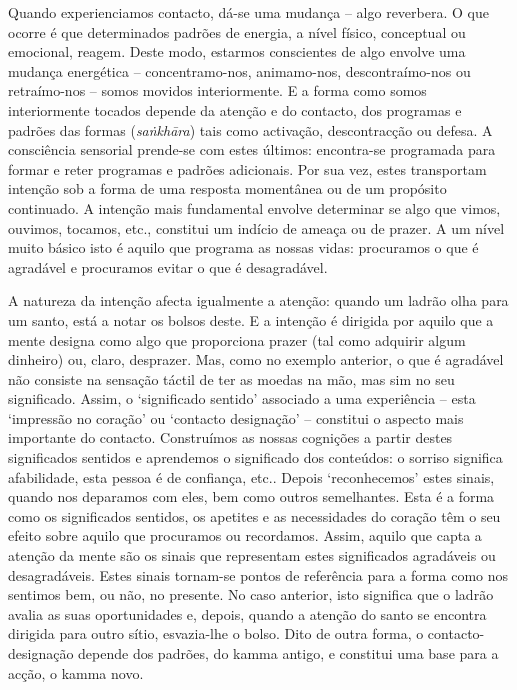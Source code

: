 Quando experienciamos contacto, dá-se uma mudança -- algo reverbera. O que ocorre é que determinados padrões de energia, a nível físico, conceptual ou emocional, reagem. Deste modo, estarmos conscientes de algo envolve uma mudança energética -- concentramo-nos, animamo-nos, descontraímo-nos ou retraímo-nos -- somos movidos interiormente. E a forma como somos interiormente tocados depende da atenção e do contacto, dos programas e padrões das formas (\emph{saṅkhāra}) tais como activação, descontracção ou defesa. A consciência sensorial prende-se com estes últimos: encontra-se programada para formar e reter programas e padrões adicionais. Por sua vez, estes transportam intenção sob a forma de uma resposta momentânea ou de um propósito continuado. A intenção mais fundamental envolve determinar se algo que vimos, ouvimos, tocamos, etc., constitui um indício de ameaça ou de prazer. A um nível muito básico isto é aquilo que programa as nossas vidas: procuramos o que é agradável e procuramos evitar o que é desagradável.

A natureza da intenção afecta igualmente a atenção: quando um ladrão olha para um santo, está a notar os bolsos deste. E a intenção é dirigida por aquilo que a mente designa como algo que proporciona prazer (tal como adquirir algum dinheiro) ou, claro, desprazer. Mas, como no exemplo anterior, o que é agradável não consiste na sensação táctil de ter as moedas na mão, mas sim no seu significado. Assim, o `significado sentido' associado a uma experiência -- esta `impressão no coração' ou `contacto designação' -- constitui o aspecto mais importante do contacto. Construímos as nossas cognições a partir destes significados sentidos e aprendemos o significado dos conteúdos: o sorriso significa afabilidade, esta pessoa é de confiança, etc.. Depois `reconhecemos' estes sinais, quando nos deparamos com eles, bem como outros semelhantes. Esta é a forma como os significados sentidos, os apetites e as necessidades do coração têm o seu efeito sobre aquilo que procuramos ou recordamos. Assim, aquilo que capta a atenção da mente são os sinais que representam estes significados agradáveis ou desagradáveis. Estes sinais tornam-se pontos de referência para a forma como nos sentimos bem, ou não, no presente. No caso anterior, isto significa que o ladrão avalia as suas oportunidades e, depois, quando a atenção do santo se encontra dirigida para outro sítio, esvazia-lhe o bolso. Dito de outra forma, o contacto-designação depende dos padrões, do kamma antigo, e constitui uma base para a acção, o kamma novo.

